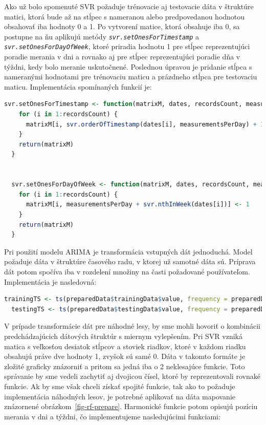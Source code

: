 \documentclass[a4paper,slovak,12pt,appendix]{article}
\begin{document}
Ako už bolo spomenuté SVR požaduje trénovacie aj testovacie dáta v štruktúre
matici, ktorá bude až na stĺpec s nameranou alebo predpovedanou hodnotou
obsahovať iba hodnoty 0 a 1. Po vytvorení matice, ktorá obsahuje iba 0, sa
postupne na ňu aplikujú metódy \texttt{\textit{svr.setOnesForTimestamp}} a \texttt{\textit{svr.setOnesForDayOfWeek}},
ktoré priradia hodnotu 1 pre stĺpec reprezentujúci poradie merania v dni a
rovnako aj pre stĺpec reprezentujúci poradie dňa v týždni, kedy bolo meranie
uskutočnené. Poslednou úpravou je pridanie stĺpca s nameranými hodnotami pre
trénovaciu maticu a prázdneho stĺpca pre testovaciu maticu. Implementácia
spomínaných funkcií je:

\begin{lstlisting}[language=R]
  svr.setOnesForTimestamp <- function(matrixM, dates, recordsCount, measurementsPerDay) {
    for (i in 1:recordsCount) {
      matrixM[i, svr.orderOfTimestamp(dates[i], measurementsPerDay) + 1] <- 1
    }
    return(matrixM)
  }


  svr.setOnesForDayOfWeek <- function(matrixM, dates, recordsCount, measurementsPerDay) {
    for (i in 1:recordsCount) {
      matrixM[i, measurementsPerDay + svr.nthInWeek(dates[i])] <- 1
    }
    return(matrixM)
  }
\end{lstlisting}

Pri použití modelu ARIMA je transformácia vstupných dát jednoduchá. Model požaduje
dáta v štruktúre časového radu, v ktorej už samotné dáta sú. Príprava dát potom
spočíva iba v rozdelení množiny na časti požadované používateľom. Implementácia
je nasledovná:

\begin{lstlisting}[language=R]
  trainingTS <- ts(preparedData$trainingData$value, frequency = preparedData$measurementsPerDay)
  testingTS <- ts(preparedData$testingData$value, frequency = preparedData$measurementsPerDay)
\end{lstlisting}

V prípade transformácie dát pre náhodné lesy, by sme mohli hovoriť o kombinácii
predchádzajúcich dátových štruktúr s miernym vylepšením. Pri SVR vzniká matica
s veľkosťou desiatok stĺpcov a stoviek riadkov, ktoré v každom riadku
obsahujú práve dve hodnoty 1, zvyšok sú samé 0. Dáta v takomto formáte je
zložité graficky znázorniť a pritom sa jedná iba o 2 neklesajúce funkcie.
Toto správanie by sme vedeli zachytiť aj dvojicou čísel, ktoré by
reprezentovali rovnaké funkcie. Ak by sme však chceli získať
spojité funkcie, tak ako to požaduje implementácia náhodných lesov, je potrebné
aplikovať na dáta mapovanie znázornené obrázkom~\ref{fig-rf-prepare}. Harmonické
funkcie potom opisujú pozíciu merania v dni a týždni, čo implementujeme
nasledujúcimi funkciami:
\end{document}
